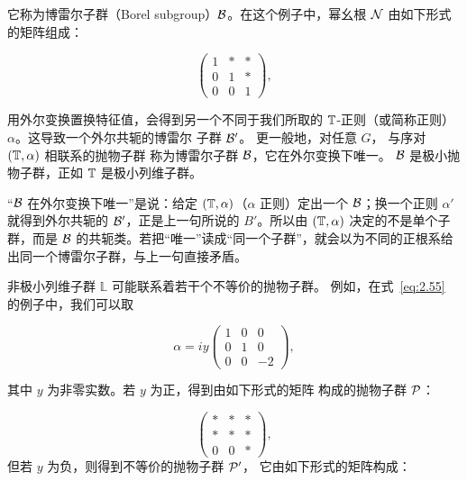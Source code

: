 它称为博雷尔子群（Borel subgroup）$\mathcal{B}$。在这个例子中，幂幺根 $\mathcal{N}$
由如下形式的矩阵组成：

\setcounter{equation}{57}
\begin{equation}\label{eq:2.58}
  \left(\begin{matrix}1&*&*\\ 0&1&*\\ 0&0&1\end{matrix}\right),
\end{equation}


用外尔变换置换特征值，会得到另一个不同于我们所取的 ${\mathbb{T}}$-正则（或简称正则）
$\alpha$。这导致一个外尔共轭的博雷尔
子群 $\mathcal{B}'$。
更一般地，对任意 $G$，
与序对 $({\mathbb{T}},\alpha)$ 相联系的抛物子群
称为博雷尔子群 $\mathcal{B}$，它在外尔变换下唯一。
$\mathcal{B}$ 是极小抛物子群，正如 ${\mathbb{T}}$ 是极小列维子群。

\begin{yizhu}[易错点]
“$\mathcal{B}$ 在外尔变换下唯一”是说：给定 $({\mathbb{T}},\alpha)$（$\alpha$ 正则）定出一个 $\mathcal{B}$；换一个正则 $\alpha'$ 就得到外尔共轭的 $\mathcal{B}'$，正是上一句所说的 $B'$。所以由 $({\mathbb{T}},\alpha)$ 决定的不是单个子群，而是 $\mathcal{B}$ 的共轭类。若把“唯一”读成“同一个子群”，就会以为不同的正根系给出同一个博雷尔子群，与上一句直接矛盾。
\end{yizhu}

非极小列维子群 $\mathbb{L}$ 可能联系着若干个不等价的抛物子群。
例如，在式~\eqref{eq:2.55} 的例子中，我们可以取

\setcounter{equation}{58}
\begin{equation}\label{eq:2.59}
  \alpha=iy\left(\begin{matrix}1&0&0\\ 0&1&0\\ 0&0&-2\end{matrix}\right),
\end{equation}

其中 $y$ 为非零实数。若 $y$ 为正，得到由如下形式的矩阵
构成的抛物子群 $\mathcal{P}$：

\setcounter{equation}{59}
\begin{equation}\label{eq:2.60}
  \left(\begin{matrix}*& * & * \\
                        * & * & * \\
                        0 & 0 & * \end{matrix}\right),
\end{equation}
但若 $y$ 为负，则得到不等价的抛物子群 $\mathcal{P}'$，
                        它由如下形式的矩阵构成：

